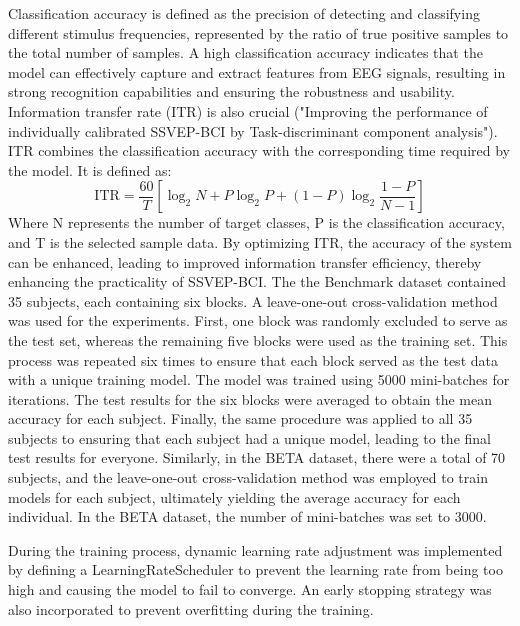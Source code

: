 \documentclass[10pt]{iopart}
\begin{document}
Classification accuracy is defined as the precision of detecting and classifying different stimulus frequencies, represented by the ratio of true positive samples to the total number of samples. A high classification accuracy indicates that the model can effectively capture and extract features from EEG signals, resulting in strong recognition capabilities and ensuring the robustness and usability.
Information transfer rate (ITR)\cite{wolpaw2002brain} is also crucial ("Improving the performance of individually calibrated SSVEP-BCI by Task-discriminant component analysis"). ITR combines the classification accuracy with the corresponding time required by the model. It is defined as:
\begin{equation}
    \text{ITR} = \frac{60}{T} \left[ \log_2 N + P \log_2 P + (1 - P) \log_2 \frac{1 - P}{N - 1} \right]
\end{equation}
Where N represents the number of target classes, P is the classification accuracy, and T is the selected sample data. By optimizing ITR, the accuracy of the system can be enhanced, leading to improved information transfer efficiency, thereby enhancing the practicality of SSVEP-BCI.
The the Benchmark dataset contained 35 subjects, each containing six blocks. A leave-one-out cross-validation method was used for the experiments. First, one block was randomly excluded to serve as the test set, whereas the remaining five blocks were used as the training set. This process was repeated six times to ensure that each block served as the test data with a unique training model. The model was trained using 5000 mini-batches for iterations. The test results for the six blocks were averaged to obtain the mean accuracy for each subject. Finally, the same procedure was applied to all 35 subjects to ensuring that each subject had a unique model, leading to the final test results for everyone. Similarly, in the BETA dataset, there were a total of 70 subjects, and the leave-one-out cross-validation method was employed to train models for each subject, ultimately yielding the average accuracy for each individual. In the BETA dataset, the number of mini-batches was set to 3000.

During the training process, dynamic learning rate adjustment was implemented by defining a LearningRateScheduler to prevent the learning rate from being too high and causing the model to fail to converge. An early stopping strategy was also incorporated to prevent overfitting during the training.
\end{document}
